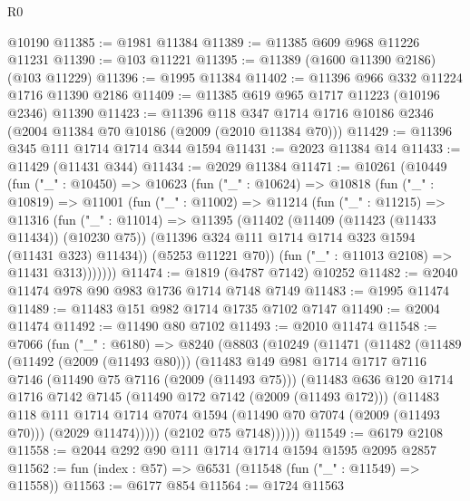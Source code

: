 \begin{lexlean}{R0}
\begin{coremodule}
    @10190
@11385 := @1981 @11384
@11389 := @11385 @609 @968 @11226 @11231
@11390 := @103 @11221
@11395 := @11389 (@1600 @11390 @2186) (@103 @11229)
@11396 := @1995 @11384
@11402 := @11396 @966 @332 @11224 @1716 @11390 @2186
@11409 := @11385 @619 @965 @1717 @11223 (@10196 @2346) @11390
@11423 := @11396
    @118
    @347
    @1714
    @1716
    @10186
    @2346
    (@2004 @11384 @70 @10186 (@2009 (@2010 @11384 @70)))
@11429 := @11396 @345 @111 @1714 @1714 @344 @1594
@11431 := @2023 @11384 @14
@11433 := @11429 (@11431 @344)
@11434 := @2029 @11384
@11471 := @10261
    (@10449
      (fun ("_" : @10450) =>
      @10623
        (fun ("_" : @10624) =>
        @10818
          (fun ("_" : @10819) =>
          @11001
            (fun ("_" : @11002) =>
            @11214
              (fun ("_" : @11215) =>
              @11316
                (fun ("_" : @11014) =>
                @11395
                  (@11402
                    (@11409 (@11423 (@11433 @11434)) (@10230 @75))
                    (@11396 @324 @111 @1714 @1714 @323 @1594 (@11431 @323) @11434))
                  (@5253 @11221 @70))
                (fun ("_" : @11013 @2108) => @11431 @313)))))))
@11474 := @1819 (@4787 @7142) @10252
@11482 := @2040 @11474 @978 @90 @983 @1736 @1714 @7148 @7149
@11483 := @1995 @11474
@11489 := @11483 @151 @982 @1714 @1735 @7102 @7147
@11490 := @2004 @11474
@11492 := @11490 @80 @7102
@11493 := @2010 @11474
@11548 := @7066
    (fun ("_" : @6180) =>
    @8240
      (@8803
        (@10249
          (@11471
            (@11482
              (@11489
                (@11492 (@2009 (@11493 @80)))
                (@11483
                  @149
                  @981
                  @1714
                  @1717
                  @7116
                  @7146
                  (@11490 @75 @7116 (@2009 (@11493 @75)))
                  (@11483
                    @636
                    @120
                    @1714
                    @1716
                    @7142
                    @7145
                    (@11490 @172 @7142 (@2009 (@11493 @172)))
                    (@11483
                      @118
                      @111
                      @1714
                      @1714
                      @7074
                      @1594
                      (@11490 @70 @7074 (@2009 (@11493 @70)))
                      (@2029 @11474)))))
              (@2102 @75 @7148))))))
@11549 := @6179 @2108
@11558 := @2044 @292 @90 @111 @1714 @1714 @1594 @1595 @2095 @2857
@11562 := fun (index : @57) => @6531 (@11548 (fun ("_" : @11549) => @11558))
@11563 := @6177 @854
@11564 := @1724 @11563

\end{coremodule}
\end{lexlean}
